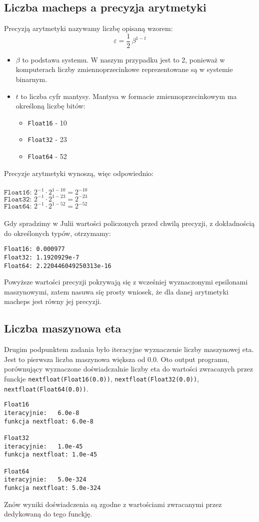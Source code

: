 \documentclass{article}
\begin{document}
\subsection{Liczba macheps a precyzja arytmetyki}
Precyzją arytmetyki nazywamy liczbę opisaną wzorem:\\
\[
\varepsilon = \frac{1}{2} \, \beta^{1-t}
\]
\begin{itemize}
    \item $\beta$ to podstawa systemu. W naszym przypadku jest to 2, ponieważ w komputerach liczby zmiennoprzecinkowe reprezentowane są w systemie binarnym.
    \item $t$ to liczba cyfr mantysy. Mantysa w formacie zmiennoprzecinkowym ma określoną liczbę bitów:
    \begin{itemize}
        \item \texttt{Float16} - 10
        \item \texttt{Float32} - 23
        \item \texttt{Float64} - 52
    \end{itemize}
\end{itemize}
Precyzje arytmetyki wynoszą, więc odpowiednio:\\\\
$ \texttt{Float16: } 2^{-1} \cdot 2^{1-10} = 2^{-10} $\\
$ \texttt{Float32: } 2^{-1} \cdot 2^{1-23} = 2^{-23} $\\
$ \texttt{Float64: } 2^{-1} \cdot 2^{1-52} = 2^{-52} $\\\\
Gdy spradzimy w Julii wartości policzonych przed chwilą precyzji, z dokładnością do określonych typów, otrzymamy:\\
\begin{verbatim}
Float16: 0.000977
Float32: 1.1920929e-7
Float64: 2.220446049250313e-16
\end{verbatim}
Powyższe wartości precyzji pokrywają się z wcześniej wyznaczonymi epsilonami maszynowymi, zatem nasuwa się prosty wniosek, że dla danej arytmetyki macheps jest równy jej precyzji.

\subsection{Liczba maszynowa eta}
Drugim podpunktem zadania było iteracyjne wyznaczenie liczby maszynowej eta. Jest to pierwsza liczba maszynowa większa od 0.0. Oto output programu, porównujący wyznaczone doświadczalnie liczby eta do wartości zwracanych przez funckje \texttt{nextfloat(Float16(0.0))}, \texttt{nextfloat(Float32(0.0))}, \\ \texttt{nextfloat(Float64(0.0))}.
\begin{verbatim}
Float16
iteracyjnie:   6.0e-8
funkcja nextfloat: 6.0e-8

Float32
iteracyjnie:   1.0e-45
funkcja nextfloat: 1.0e-45

Float64
iteracyjnie:   5.0e-324
funkcja nextfloat: 5.0e-324
\end{verbatim}
Znów wyniki doświadczenia są zgodne z wartościami zwracanymi przez dedykowaną do tego funckję.\\
\end{document}
